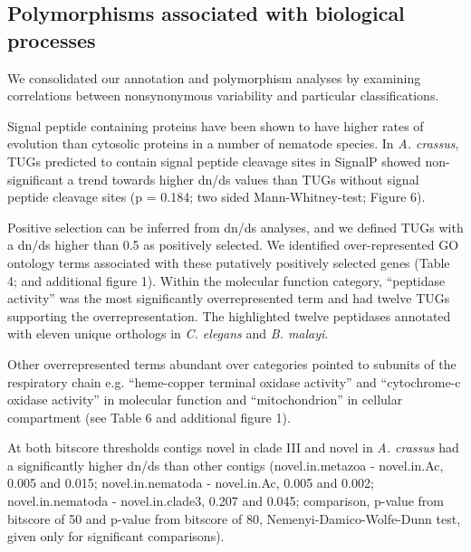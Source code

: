 \documentclass[10pt]{bmc_article}
\newenvironment{bmcformat}{\begin{raggedright}\baselineskip20pt\sloppy\setboolean{publ}{false}}{\end{raggedright}\baselineskip20pt\sloppy}
\begin{document}
\begin{bmcformat}
\subsection*{Polymorphisms associated with biological processes}

We consolidated our annotation and polymorphism analyses by examining
correlations between nonsynonymous variability and particular
classifications.

Signal peptide containing proteins have been shown to have higher
rates of evolution than cytosolic proteins in a number of nematode
species. In \textit{A. crassus}, TUGs predicted to contain signal
peptide cleavage sites in SignalP showed non-significant a trend
towards higher dn/ds values than TUGs without signal peptide cleavage
sites (p = 0.184; two sided
Mann-Whitney-test; Figure 6).

Positive selection can be inferred from dn/ds analyses, and we defined
TUGs with a dn/ds higher than 0.5 as positively selected. We
identified over-represented GO ontology terms associated with these
putatively positively selected genes (Table 4; and additional figure
1). Within the molecular function category, ``peptidase activity'' was
the most significantly overrepresented term and had twelve TUGs
supporting the overrepresentation. The highlighted twelve peptidases
annotated with eleven unique orthologs in \textit{C. elegans} and
\textit{B. malayi}.



Other overrepresented terms abundant over categories pointed to
subunits of the respiratory chain e.g. ``heme-copper terminal oxidase
activity'' and ``cytochrome-c oxidase activity'' in molecular function
and ``mitochondrion'' in cellular compartment (see Table 6 and
additional figure 1).

At both bitscore thresholds contigs novel in clade III and novel in
\textit{A. crassus} had a significantly higher dn/ds than other
contigs (novel.in.metazoa - novel.in.Ac, 0.005 and 0.015;
novel.in.nematoda - novel.in.Ac, 0.005 and 0.002; novel.in.nematoda -
novel.in.clade3, 0.207 and 0.045; comparison, p-value from bitscore of
50 and p-value from bitscore of 80, Nemenyi-Damico-Wolfe-Dunn test,
given only for significant comparisons).


\end{bmcformat}
\end{document}
